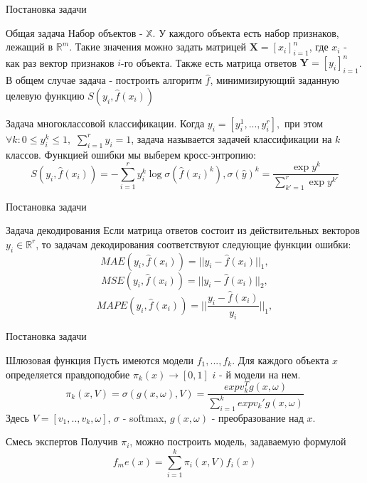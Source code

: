 \documentclass{beamer}
\begin{document}
\begin{frame}{Постановка задачи}
\begin{block}{Общая задача}
Набор объектов - $\mathbb{X}$.  У каждого объекта есть набор признаков,  лежащий в $\mathbb{R}^m$.  Такие значения можно задать матрицей 
$\mathbf{X} = [x_i]_{i = 1}^n$, где $x_i$ -  как раз вектор признаков $i$-го объекта. Также есть матрица ответов $\mathbf{Y} = [y_i]_{i = 1}^n$.  В общем случае задача - построить алгоритм $\hat{f}$, минимизирующий заданную целевую функцию $S(y_i, \hat{f}(x_i)) $
\end{block}

\begin{block}{Задача многоклассовой классификации.}
Когда $ y_i = [y_i^1, ..., y_i^r],$ при этом $ \forall k: 0 \leq y_i^k  \leq 1,$
$ \sum\limits_{i = 1}^r y_i = 1$, задача называется задачей классификации на $k$ классов. Функцией ошибки мы выберем  кросс-энтропию: 
$$S(y_i, \hat{f}(x_i)) =  - \sum\limits_{i=1}^r y_i^k \log \sigma(\hat{f}(x_i)^k), \sigma (\hat{y})^k = \frac{\exp y^k}{\sum\limits_{k' = 1}^{r} \exp y^{k'}} $$
\end{block}

\end{frame}

\begin{frame}{Постановка задачи}
\begin{block}{Задача декодирования}
Если матрица ответов состоит из действительных векторов  $y_i \in \mathbb{R}^r$, то задачам декодирования соответствуют следующие функции ошибки:
$$MAE(y_i, \hat{f}(x_i)) = || y_i - \hat{f}(x_i) ||_1,$$
$$MSE(y_i, \hat{f}(x_i)) = || y_i - \hat{f}(x_i) ||_2,$$
$$MAPE(y_i, \hat{f}(x_i)) = ||\frac{ y_i - \hat{f}(x_i)}{y_i} ||_1,$$
\end{block}

\end{frame}

\begin{frame}{Постановка задачи}


\begin{block}{Шлюзовая функция}
Пусть имеются модели $f_1, ..., f_k$.   Для каждого объекта $x$ определяется правдоподобие $\pi_k(x) \rightarrow [0, 1]$ $i$ - й модели на нем. 
$$ \pi_k(x, V) = \sigma(g(x, \omega), V) = \frac{exp v^T_k g(x, \omega)}{\sum\limits_{i = 1}^k exp v_k' g(x, \omega)}$$
Здесь  $V = [v_1, .., v_k, \omega]$, $\sigma$ - softmax, $g(x, \omega)$ - преобразование над $x$.
\end{block}


\begin{block}{Смесь экспертов}
Получив $\pi_i$, можно построить модель, задаваемую формулой 
$$ f_me(x) = \sum\limits_{i =1}^{k} \pi_i(x, V) f_i(x)$$
\end{block}

\end{frame}
\end{document}
